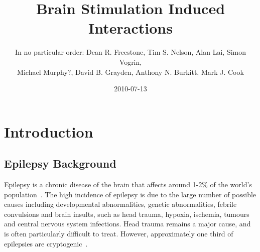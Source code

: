 \documentclass[]{article}
\title{Brain Stimulation Induced Interactions}
\author{In no particular order: Dean R. Freestone, Tim S. Nelson, Alan Lai, Simon Vogrin,\\
 Michael Murphy?, David B. Grayden, Anthony N. Burkitt, Mark J. Cook}
\date{2010-07-13}
\begin{document}
\ifpdf
{}
\else
{}
\fi

\maketitle


\begin{abstract}
\end{abstract}

\section{Introduction}
% 
% 

\subsection{Epilepsy Background}
Epilepsy is a chronic disease of the brain that affects around 1-2\% of the world’s population~\cite{Beran1985,Dua2006}. The high incidence of epilepsy is due to the large number of possible causes including developmental abnormalities, genetic abnormalities, febrile convulsions and brain insults, such as head trauma, hypoxia, ischemia, tumours and central nervous system infections. Head trauma remains a major cause, and is often particularly difficult to treat. However, approximately one third of epilepsies are cryptogenic~\cite{Theodore2006}.
\end{document}
